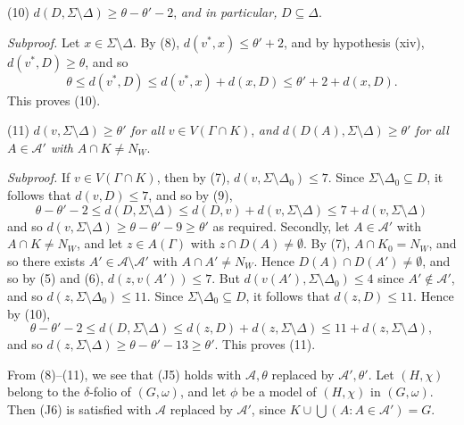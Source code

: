 \hspace*{12pt}(10) $d(D, \Sigma \setminus \Delta) \ge \theta - \theta' - 2$, \textit{and in particular,} $D \subseteq \Delta$.

\textit{Subproof.} Let $x \in \Sigma \setminus \Delta$. By (8), $d(v^*, x) \le \theta' + 2$, and by hypothesis (xiv), $d(v^*, D) \ge \theta$, and so
\begin{equation*}
\theta \le d(v^*, D) \le d(v^*, x) + d(x, D) \le \theta' + 2 + d(x, D).
\end{equation*}
This proves (10).

\hspace*{12pt}(11) $d(v, \Sigma \setminus \Delta) \ge \theta'$ \textit{for all} $v \in V(\Gamma \cap K)$, \textit{and} $d(D(A), \Sigma \setminus \Delta) \ge \theta'$ \textit{for all} $A \in \mathcal{A}'$ \textit{with} $A \cap K \ne N_W$.

\textit{Subproof.} If $v \in V(\Gamma \cap K)$, then by (7), $d(v, \Sigma \setminus \Delta_0) \le 7$. Since $\Sigma \setminus \Delta_0 \subseteq D$, it follows that $d(v, D) \le 7$, and so by (9),
\begin{equation*}
\theta - \theta' - 2 \le d(D, \Sigma \setminus \Delta) \le d(D, v) + d(v, \Sigma \setminus \Delta) \le 7 + d(v, \Sigma \setminus \Delta)
\end{equation*}
and so $d(v, \Sigma \setminus \Delta) \ge \theta - \theta' - 9 \ge \theta'$ as required. Secondly, let $A \in \mathcal{A}'$ with $A \cap K \ne N_W$, and let $z \in A(\Gamma)$ with $z \cap D(A) \ne \emptyset$. By (7), $A \cap K_0 = N_W$, and so there exists $A' \in \mathcal{A} \setminus \mathcal{A}'$ with $A \cap A' \ne N_W$. Hence $D(A) \cap D(A') \ne \emptyset$, and so by (5) and (6), $d(z, v(A')) \le 7$. But $d(v(A'), \Sigma \setminus \Delta_0) \le 4$ since $A' \notin \mathcal{A}'$, and so $d(z, \Sigma \setminus \Delta_0) \le 11$. Since $\Sigma \setminus \Delta_0 \subseteq D$, it follows that $d(z, D) \le 11$. Hence by (10),
\begin{equation*}
\theta - \theta' - 2 \le d(D, \Sigma \setminus \Delta) \le d(z, D) + d(z, \Sigma \setminus \Delta) \le 11 + d(z, \Sigma \setminus \Delta),
\end{equation*}
and so $d(z, \Sigma \setminus \Delta) \ge \theta - \theta' - 13 \ge \theta'$. This proves (11).

From (8)--(11), we see that (J5) holds with $\mathcal{A}, \theta$ replaced by $\mathcal{A}', \theta'$. Let $(H, \chi)$ belong to the $\delta$-folio of $(G, \omega)$, and let $\phi$ be a model of $(H, \chi)$ in $(G, \omega)$. Then (J6) is satisfied with $\mathcal{A}$ replaced by $\mathcal{A}'$, since $K \cup \bigcup(A : A \in \mathcal{A}') = G$.

